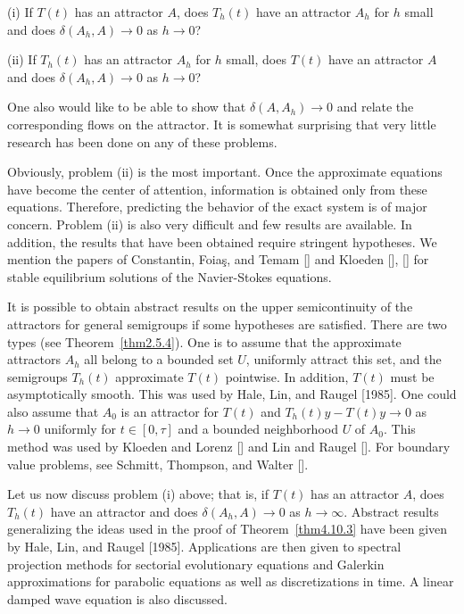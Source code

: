 \documentclass{surv-l}
\theoremstyle{plain}
\theoremstyle{definition}
\numberwithin{equation}{section}
\numberwithin{figure}{chapter}
\begin{document}
(i) If $T(t)$ has an attractor $A$, does $T_{h}(t)$ have an attractor $A_{h}$ for $h$ small and does $\delta(A_{h}, A)\rightarrow 0$ as $h\rightarrow 0$?

(ii) If $T_{h}(t)$ has an attractor $A_{h}$ for $h$ small, does $T(t)$ have an attractor $A$ and does $\delta(A_{h}, A)\rightarrow 0$ as $h\rightarrow 0$?

One also would like to be able to show that $\delta(A, A_{h})\rightarrow 0$ and relate the corresponding flows on the attractor. It is somewhat surprising that very little research has been done on any of these problems.

Obviously, problem (ii) is the most important. Once the approximate equations have become the center of attention, information is obtained only from these equations. Therefore, predicting the behavior of the exact system is of major concern. Problem (ii) is also very difficult and few results are available. In addition, the results that have been obtained require stringent hypotheses. We mention the papers of Constantin, Foia\c{s}, and Temam [\citeyear{1984cft}] and Kloeden [\citeyear{1984k}], [\citeyear{1986kl}] for stable equilibrium solutions of the Navier-Stokes equations.

It is possible to obtain abstract results on the upper semicontinuity of the attractors for general semigroups if some hypotheses are satisfied. There are two types (see Theorem~\ref{thm2.5.4}). One is to assume that the approximate attractors $A_{h}$ all belong to a bounded set $U$, uniformly attract this set, and the semigroups $T_{h}(t)$ approximate $T(t)$ pointwise. In addition, $T(t)$ must be asymptotically smooth. This was used by Hale, Lin, and Raugel [1985]. One could also assume that $A_{0}$ is an attractor for $T(t)$ and $T_{h}(t)y-T(t)y\rightarrow 0$ as $h\rightarrow 0$ uniformly for $t\in[0,\tau]$ and a bounded neighborhood $U$ of $A_{0}$. This method was used by Kloeden and Lorenz [\citeyear{1986kl}] and Lin and Raugel [\citeyear{1986lr}]. For boundary value problems, see Schmitt, Thompson, and Walter [\citeyear{1978stw}].

Let us now discuss problem (i) above; that is, if $T(t)$ has an attractor $A$, does $T_{h}(t)$ have an attractor and does $\delta(A_{h},A)\rightarrow 0$ as $ h\rightarrow\infty$. Abstract results generalizing the ideas used in the proof of Theorem~\ref{thm4.10.3} have been given by Hale, Lin, and Raugel [1985]. Applications are then given to spectral projection methods for sectorial evolutionary equations and Galerkin approximations for parabolic equations as well as discretizations in time. A linear damped wave equation is also discussed.
\end{document}
